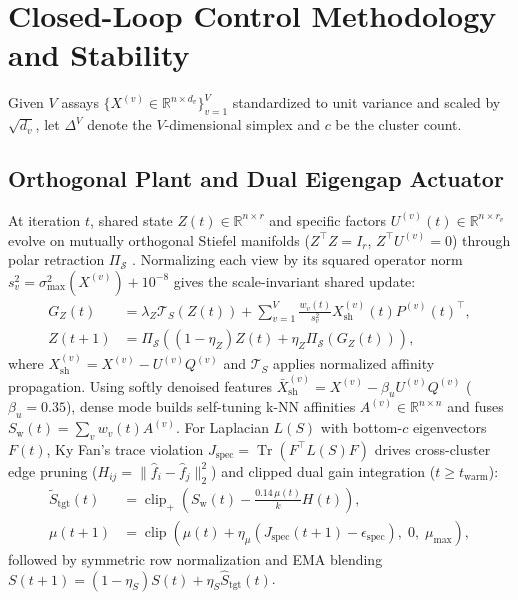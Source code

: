 \documentclass[journal]{IEEEtran}
\begin{document}
\section{Closed-Loop Control Methodology and Stability}

Given $V$ assays $\{X^{(v)} \in \mathbb{R}^{n \times d_v}\}_{v=1}^V$ standardized to unit variance and scaled by $\sqrt{d_v}$, let $\Delta^V$ denote the $V$-dimensional simplex and $c$ be the cluster count.

\subsection{Orthogonal Plant and Dual Eigengap Actuator}
At iteration $t$, shared state $Z(t) \in \mathbb{R}^{n \times r}$ and specific factors $U^{(v)}(t) \in \mathbb{R}^{n \times r_v}$ evolve on mutually orthogonal Stiefel manifolds ($Z^\top Z = I_r$, $Z^\top U^{(v)} = 0$) through polar retraction $\Pi_{\mathcal{S}}$ \cite{edelman1998geometry}. Normalizing each view by its squared operator norm $s_v^2 = \sigma_{\max}^2(X^{(v)}) + 10^{-8}$ gives the scale-invariant shared update:
\begin{equation}
\begin{aligned}
G_Z(t) &= \lambda_Z \mathcal{T}_S(Z(t)) + \sum_{v=1}^V \frac{w_v(t)}{s_v^2} X_{\mathrm{sh}}^{(v)}(t) P^{(v)}(t)^\top, \\
Z(t+1) &= \Pi_{\mathcal{S}}\!\left((1-\eta_Z) Z(t) + \eta_Z \Pi_{\mathcal{S}}(G_Z(t))\right),
\end{aligned}
\label{eq:p2_plant}
\end{equation}
where $X_{\mathrm{sh}}^{(v)} = X^{(v)} - U^{(v)} Q^{(v)}$ and $\mathcal{T}_S$ applies normalized affinity propagation. Using softly denoised features $\bar{X}_{\mathrm{sh}}^{(v)} = X^{(v)} - \beta_u U^{(v)} Q^{(v)}$ ($\beta_u = 0.35$), dense mode builds self-tuning k-NN affinities $A^{(v)} \in \mathbb{R}^{n \times n}$ \cite{vonluxburg2007tutorial} and fuses $S_{\mathrm{w}}(t) = \sum_v w_v(t) A^{(v)}$. For Laplacian $L(S)$ with bottom-$c$ eigenvectors $F(t)$, Ky Fan's trace violation $J_{\mathrm{spec}} = \operatorname{Tr}(F^\top L(S) F)$ \cite{fan1949theorem} drives cross-cluster edge pruning ($H_{ij} = \|\hat{f}_i - \hat{f}_j\|_2^2$) and clipped dual gain integration ($t \ge t_{\mathrm{warm}}$):
\begin{equation}
\begin{aligned}
\tilde{S}_{\mathrm{tgt}}(t) &= \operatorname{clip}_+\!\left(S_{\mathrm{w}}(t) - \frac{0.14\,\mu(t)}{k} H(t)\right), \\
\mu(t+1) &= \operatorname{clip}\!\left(\mu(t) + \eta_\mu(J_{\mathrm{spec}}(t+1) - \epsilon_{\mathrm{spec}}),\; 0,\; \mu_{\max}\right),
\end{aligned}
\label{eq:p2_dual}
\end{equation}
followed by symmetric row normalization and EMA blending $S(t+1) = (1-\eta_S)S(t) + \eta_S \hat{S}_{\mathrm{tgt}}(t)$.
\end{document}
